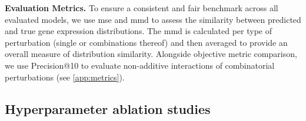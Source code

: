 \textbf{Evaluation Metrics.} To ensure a consistent and fair benchmark across all evaluated models, we use \gls{mse} and \gls{mmd} to assess the similarity between predicted and true gene expression distributions.
The \gls{mmd} is calculated per type of perturbation (single or combinations thereof) and then averaged to provide an overall measure of distribution similarity.
Alongside objective metric comparison, we use Precision@10 to evaluate non-additive interactions of combinatorial perturbations (see \cref{app:metrics}).

\subsection{Hyperparameter ablation studies} 
%
